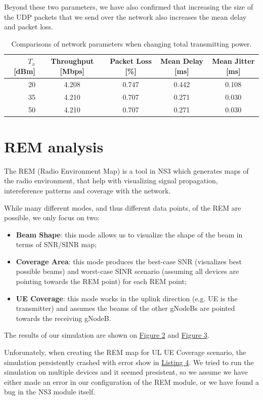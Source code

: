 \documentclass[10pt,a4]{article}
\begin{document}
    Beyond these two parameters, we have also confirmed that increasing the size of the UDP packets that we send over the network also increases the mean delay and packet loss.
    \begin{table}[ht!]
    \caption{Comparisons of network parameters when changing total transmitting power.}
    \label{tab:power}
    \begin{tabular}{r|cccc}
    $T_x$ [dBm] & Throughput [Mbps] & Packet Loss [\%] & Mean Delay [ms] & Mean Jitter [ms] \\
    \hline
    20 & 4.208 & 0.747  & 0.442 & 0.108 \\
    35 & 4.210 & 0.707 & 0.271 & 0.030  \\
    50 & 4.210 & 0.707 & 0.271 & 0.030
    \end{tabular}
    \end{table}


    \section{REM analysis}
    The REM (Radio Environment Map) is a tool in NS3 which generates maps of the radio environment, that help with visualizing signal propagation, intereference patterns and coverage with the network.

    While many different modes, and thus different data points, of the REM are possible, we only focus on two:
    \begin{itemize}
        \item \textbf{Beam Shape}: this mode allows us to visualize the shape of the beam in terms of SNR/SINR map;
        \item \textbf{Coverage Area}: this mode produces the best-case SNR (visualizes best possible beams) and worst-case SINR scenario (assuming all devices are pointing towards the REM point) for each REM point;
        \item \textbf{UE Coverage}: this mode works in the uplink direction (e.g. UE is the transmitter) and assumes the beams of the other gNodeBs are pointed towards the receiving gNodeB.
    \end{itemize}

    The results of our simulation are shown on \hyperref[fig:dl]{Figure 2} and \hyperref[fig:ul]{Figure 3}.

    Unforunately, when creating the REM map for UL UE Coverage scenario, the simulation persistently crashed with error show in \hyperref[lst:error]{Listing 4}. We tried to run the simulation on multiple devices and it seemed presistent, so we assume we have either made an error in our configuration of the REM module, or we have found a bug in the NS3 module itself.
\end{document}
